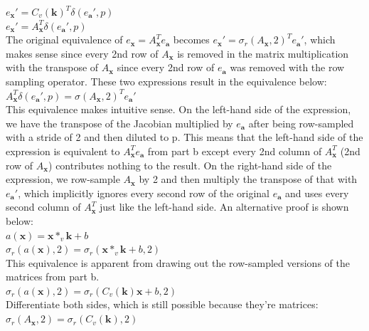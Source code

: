 \documentclass{article}
\begin{document}
$e_\textbf{x}' = C_v(\textbf{k})^T\delta(e_\textbf{a}', p)$\\

$e_\textbf{x}' = A_\textbf{x}^T\delta(e_\textbf{a}', p)$\\

The original equivalence of $e_\textbf{x} = A_\textbf{x}^Te_\textbf{a}$ becomes $e_\textbf{x}' = \sigma_r(A_\textbf{x}, 2)^Te_\textbf{a}'$, which makes sense since every 2nd row of $A_\textbf{x}$ is removed in the matrix multiplication with the transpose of $A_\textbf{x}$ since every 2nd row of $e_\textbf{a}$ was removed with the row sampling operator. These two expressions result in the equivalence below:\\

$A_\textbf{x}^T\delta(e_\textbf{a}', p) = \sigma(A_\textbf{x}, 2)^Te_\textbf{a}'$\\

This equivalence makes intuitive sense. On the left-hand side of the expression, we have the transpose of the Jacobian multiplied by $e_\textbf{a}$ after being row-sampled with a stride of 2 and then diluted to p. This means that the left-hand side of the expression is equivalent to $A_\textbf{x}^Te_\textbf{a}$ from part b except every 2nd column of $A_\textbf{x}^T$ (2nd row of $A_\textbf{x}$) contributes nothing to the result. On the right-hand side of the expression, we row-sample $A_\textbf{x}$ by 2 and then multiply the transpose of that with $e_\textbf{a}'$, which implicitly ignores every second row of the original $e_\textbf{a}$ and uses every second column of $A_\textbf{x}^T$ just like the left-hand side. An alternative proof is shown below:\\

$a(\textbf{x}) = \textbf{x} \ast_v \textbf{k} + b$\\

$\sigma_r(a(\textbf{x}), 2) = \sigma_r(\textbf{x} \ast_v \textbf{k} + b, 2)$\\

This equivalence is apparent from drawing out the row-sampled versions of the matrices from part b.\\

$\sigma_r(a(\textbf{x}), 2) = \sigma_r(C_v(\textbf{k})\textbf{x} + b, 2)$\\

Differentiate both sides, which is still possible because they're matrices:\\

$\sigma_r(A_\textbf{x}, 2) = \sigma_r(C_v(\textbf{k}), 2)$\\
\end{document}

